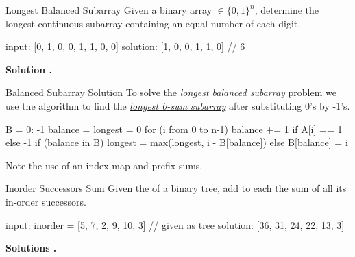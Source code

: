 \documentclass{cognito}
\begin{document}
\begin{note}{Longest Balanced Subarray}
	Given a binary array $\in \{0, 1\}^n$, determine the longest
	continuous subarray containing an equal number of each digit.
	
	\begin{largecode}
 input: [0, 1, 0, 0, 1, 1, 0, 0]
 solution: [1, 0, 0, 1, 1, 0]  // 6
	\end{largecode}
	\bf Solution \hyperref[note:Balanced Subarray Solution]{\solutionref}.
\end{note}

\begin{note}{Balanced Subarray Solution}
	To solve the \hyperref[note:Longest Balanced Subarray]{\it longest balanced subarray} problem
	we use the algorithm to find the \hyperref[note:Longest k-Sum Subarray Solution]{\it longest 0-sum subarray}
	after substituting 0's by -1's.
	\begin{largecode}
 B = {0: -1}
 balance = longest = 0
 for (i from 0 to n-1)
 	balance += 1 if A[i] == 1 else -1
	if (balance in B)
		longest = max(longest, i - B[balance])
	else B[balance] = i
	\end{largecode}
	\begin{remark} Note the use of an index map and prefix sums. \end{remark}
	\vspace{-5pt}
\end{note}

\begin{note}{Inorder Successors Sum}
	Given the  of a binary tree, add to each  the sum of all its in-order successors.
	\begin{largecode}
 input: inorder = [5, 7, 2, 9, 10, 3]  // given as tree
 solution: [36, 31, 24, 22, 13, 3]
	\end{largecode}
	\bf Solutions \hyperref[note:Recursive Inorder Successor Sum]{\solutionref} \hyperref[note:Iterative Inorder Successor Sum]{\solutionref}.
\end{note}
\end{document}
